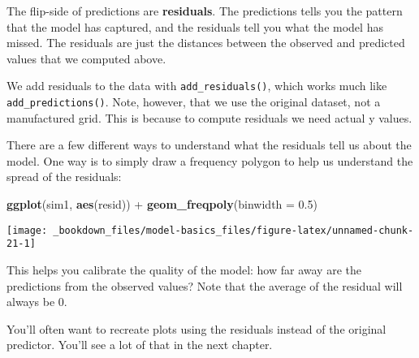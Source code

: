 \documentclass[]{book}
\newenvironment{Shaded}{\begin{snugshade}}{\end{snugshade}}
\newcommand{\KeywordTok}[1]{\textcolor[rgb]{0.13,0.29,0.53}{\textbf{{#1}}}}
\newcommand{\DataTypeTok}[1]{\textcolor[rgb]{0.13,0.29,0.53}{{#1}}}
\newcommand{\FloatTok}[1]{\textcolor[rgb]{0.00,0.00,0.81}{{#1}}}
\newcommand{\StringTok}[1]{\textcolor[rgb]{0.31,0.60,0.02}{{#1}}}
\newcommand{\CommentTok}[1]{\textcolor[rgb]{0.56,0.35,0.01}{\textit{{#1}}}}
\newcommand{\NormalTok}[1]{{#1}}
\begin{document}
The flip-side of predictions are \textbf{residuals}. The predictions
tells you the pattern that the model has captured, and the residuals
tell you what the model has missed. The residuals are just the distances
between the observed and predicted values that we computed above.

We add residuals to the data with \texttt{add\_residuals()}, which works
much like \texttt{add\_predictions()}. Note, however, that we use the
original dataset, not a manufactured grid. This is because to compute
residuals we need actual y values.

\begin{Shaded}
\end{Shaded}

There are a few different ways to understand what the residuals tell us
about the model. One way is to simply draw a frequency polygon to help
us understand the spread of the residuals:

\begin{Shaded}
\begin{Highlighting}[]
\KeywordTok{ggplot}\NormalTok{(sim1, }\KeywordTok{aes}\NormalTok{(resid)) +}\StringTok{ }
\StringTok{  }\KeywordTok{geom_freqpoly}\NormalTok{(}\DataTypeTok{binwidth =} \FloatTok{0.5}\NormalTok{)}
\end{Highlighting}
\end{Shaded}

\begin{center}\texttt{[image: \_bookdown\_files/model-basics\_files/figure-latex/unnamed-chunk-21-1]} \end{center}

This helps you calibrate the quality of the model: how far away are the
predictions from the observed values? Note that the average of the
residual will always be 0.

You'll often want to recreate plots using the residuals instead of the
original predictor. You'll see a lot of that in the next chapter.
\end{document}
